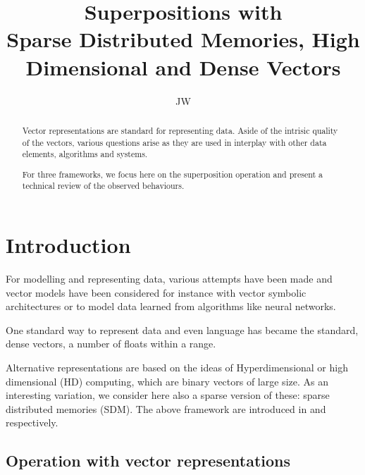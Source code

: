 \documentclass[11pt]{article}
\title{\textbf{Superpositions with  \\ Sparse Distributed Memories, High Dimensional and Dense Vectors}} %
\author{JW}
\date{}
\begin{document}
\maketitle
\begin{abstract}
Vector representations are standard for representing data.
Aside of the intrisic quality of the vectors, various questions 
arise as they are used in interplay with other data elements,
algorithms and systems.


For three frameworks, 
we focus here on the superposition operation and present a technical review of the observed behaviours. 





\end{abstract}

\section{Introduction}
For modelling and representing data, various attempts have been made
and vector models have been considered for instance with
 vector symbolic architectures or to model data learned from algorithms like neural networks.


One standard way to represent data and even language has became
the standard, dense vectors, a number of floats within a range.

Alternative representations are based on the ideas of Hyperdimensional or high dimensional (HD) computing, which are binary vectors of large size. As an interesting variation, we consider here also a sparse version of these: sparse distributed memories (SDM).
The above framework are introduced in \cite{kanerva1} 
and  \cite{kanerva2} respectively.



\subsection{Operation with vector representations}
\end{document}
